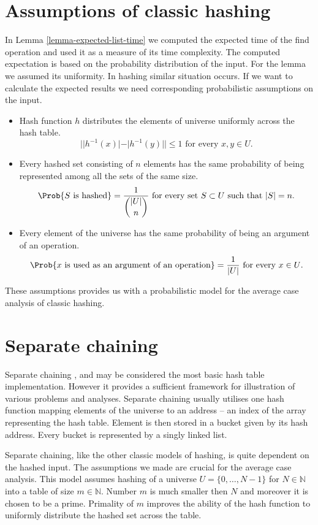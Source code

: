 \section{Assumptions of classic hashing}
In Lemma \ref{lemma-expected-list-time} we computed the expected time of the find operation and used it as a measure of its time complexity. The computed expectation is based on the probability distribution of the input. For the lemma we assumed its uniformity. In hashing similar situation occurs. If we want to calculate the expected results we need corresponding probabilistic assumptions on the input.
\begin{itemize}
\item Hash function $h$ distributes the elements of universe uniformly across the hash table.
\[
||h^{-1}(x)| - |h^{-1}(y)|| \leq 1 \text{ for every }x, y \in U \text{.}
\]
\item Every hashed set consisting of $n$ elements has the same probability of being represented among all the sets of the same size.
\[
\Prob{S \text{ is hashed}} = \frac{1}{\dbinom{|U|}{n}} \text{ for every set } S \subset U \text{ such that } |S| = n \text{.}
\]
\item Every element of the universe has the same probability of being an argument of an operation.
\[
\Prob{x \text{ is used as an argument of an operation}} = \frac{1}{|U|} \text{ for every } x \in U \text{.}
\]
\end{itemize}

These assumptions provides us with a probabilistic model for the average case analysis of classic hashing.

\section{Separate chaining}
Separate chaining \cite{The-art-of-computer-programming}, \cite{DBLP:books/sp/Mehlhorn84} and \cite{DBLP:books/sp/MehlhornS2008} may be considered the most basic hash table implementation. However it provides a sufficient framework for illustration of various problems and analyses. Separate chaining usually utilises one hash function mapping elements of the universe to an address -- an index of the array representing the hash table. Element is then stored in a bucket given by its hash address. Every bucket is represented by a singly linked list. 

Separate chaining, like the other classic models of hashing, is quite dependent on the hashed input. The assumptions we made are crucial for the average case analysis. This model assumes hashing of a universe $U = \{0, \dots, N - 1\}$ for $N \in \mathbb{N}$ into a table of size $m \in \mathbb{N}$. Number $m$ is much smaller then $N$ and moreover it is chosen to be a prime. Primality of $m$ improves the ability of the hash function to uniformly distribute the hashed set across the table. 

